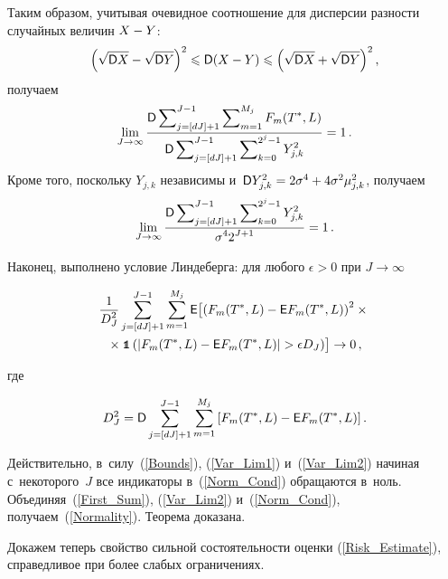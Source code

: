 \begin{multicols}{2}
Таким образом, учитывая очевидное соотношение для дисперсии разности
 случайных величин $X\hm-Y$: 
 $$
 \left(\sqrt{\Variance X}-\sqrt{\Variance Y}\right)^2
\leqslant\Variance(X-Y)\leqslant\left(\sqrt{\Variance X}\hm+\sqrt{\Variance Y}\right)^2,
$$
 получаем
\begin{equation}
\label{Var_Lim1}
\lim\limits_{J\to\infty}\displaystyle\frac{\displaystyle {\sf D}\sum\nolimits_{j=[dJ]+1}^{J-1}\sum\nolimits_{m=1}^{M_j} 
F_m(T^*,L)\mathstrut}{\displaystyle {\sf D}\sum\nolimits_{j=[dJ]+1}^{J-1}\sum\nolimits_{k=0}^{2^j-1}Y^2_{j,k}\mathstrut}=1\,.
\end{equation}
Кроме того, поскольку $Y_{j,k}$ независимы и~$\Variance Y^2_{j,k}
\hm=2\sigma^4\hm+4\sigma^2\mu^2_{j,k}$, получаем
\begin{equation}
\label{Var_Lim2}
\lim\limits_{J\to\infty}\displaystyle\frac{\displaystyle {\sf D}\sum\nolimits_{j=[dJ]+1}^{J-1}\sum\nolimits_{k=0}^{2^j-1}
Y^2_{j,k}\mathstrut}{\displaystyle \sigma^42^{J+1}\mathstrut}=1\,.
\end{equation}

Наконец, выполнено условие Линдеберга: для любого $\epsilon>0$ при $J\to\infty$

\vspace*{-6pt}

\noindent
\begin{multline}
\label{Norm_Cond}
\displaystyle\frac{\displaystyle 1\mathstrut}{\displaystyle D^2_J\mathstrut}\sum\limits_{j=[dJ]+1}^{J-1}\sum\limits_{m=1}^{M_j} 
{\sf E}  \bigl[\left( F_m(T^*,L)-{\sf E} F_m(T^*,L)\right)^2\times{}\\
{}\times
\mbox{{\small \tt {1}}\hspace{-1.3mm}{\tt 1}}\left( |F_m(T^*,L)-{\sf E} F_m(T^*,L)| >\epsilon D_J\right)\bigr]\rightarrow 0\,,
\end{multline}

\vspace*{-2pt}

\noindent
где 

\vspace*{-2pt}

\noindent
$$
D^2_J=\Variance\sum\limits_{j=[dJ]+1}^{J-1}\sum\limits_{m=1}^{M_j} 
\left[F_m(T^*,L)\hm-{\sf E} F_m(T^*,L)\right].
$$

\vspace*{-2pt}

Действительно, в~силу~(\ref{Bounds}), (\ref{Var_Lim1}) и~(\ref{Var_Lim2}) начиная с~некоторого~$J$ 
все индикаторы в~(\ref{Norm_Cond}) обращаются в~ноль. Объединяя~(\ref{First_Sum}), (\ref{Var_Lim2}) 
и~(\ref{Norm_Cond}), получаем~(\ref{Normality}). Теорема доказана.

\smallskip

Докажем теперь свойство сильной состоятельности оценки (\ref{Risk_Estimate}), справедливое при более слабых ограничениях.


\end{multicols}

